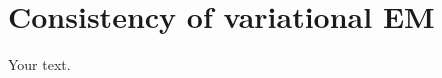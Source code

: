 \documentclass[../../main.tex]{subfiles} %
\begin{document}
\section{Consistency of variational EM}
Your text.
\end{document}
